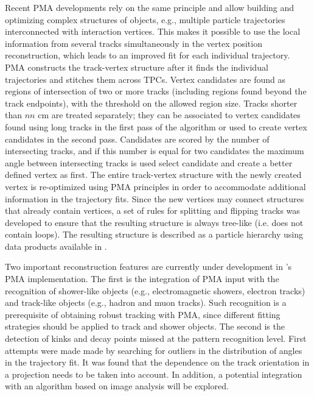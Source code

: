 Recent PMA developments rely on the same principle and allow building and optimizing complex structures of \threed objects, e.g., multiple particle trajectories interconnected with interaction vertices. This makes it possible to use the local information from several tracks simultaneously in the vertex position reconstruction, which leads to an improved fit for each individual trajectory. 
%
PMA constructs the track-vertex structure after it finds the individual trajectories and stitches them across TPCs. Vertex candidates are found as regions of intersection of two or more tracks (including regions found beyond the track endpoints), with the threshold on the allowed region size. 
Tracks shorter than $nn$ cm are treated separately; they can be associated to vertex candidates found using long tracks in the first pass of the algorithm or \fixme{}used to create vertex candidates in the second pass. Candidates are scored by the number of intersecting tracks, and if this number is equal for two candidates the maximum angle between intersecting tracks is used select candidate and create a better defined vertex as first. The entire track-vertex structure with the newly created vertex is re-optimized using PMA principles in order to accommodate additional information in the trajectory fits. Since the new vertices may connect structures that already contain vertices, a set of rules for splitting and flipping tracks was developed to ensure that the resulting structure is always tree-like (i.e. does not contain loops). The resulting structure is described as a particle hierarchy using data products available in .


Two important reconstruction features are currently under development in 's PMA implementation. The first is the integration of PMA input with the recognition 
 of shower-like \twod objects (e.g., electromagnetic showers, electron tracks) and track-like objects (e.g., hadron and muon tracks). Such recognition is a prerequisite of obtaining robust \threed tracking with PMA, since different fitting strategies should be applied to track and shower objects. The second %
is the detection of kinks and decay points missed at the \twod pattern recognition level. First attempts were made %
made by searching for outliers in the distribution of angles in the trajectory fit. It was found that the dependence on the track orientation in a \twod projection needs to be taken into account. In addition, a potential integration with an algorithm based on \twod {} image analysis will be explored.


